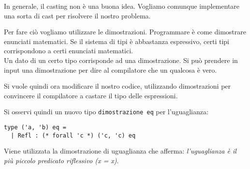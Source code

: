 \documentclass{article}
\begin{document}
In generale, il casting non è una buona idea. Vogliamo comunque implementare una sorta di cast per risolvere il nostro problema.

Per fare ciò vogliamo utilizzare le dimostrazioni. Programmare è come dimostrare enunciati matematici. Se il sistema di tipi è abbastanza espressivo, certi tipi corrispondono a certi enunciati matematici.\\
Un dato di un certo tipo corrisponde ad una dimostrazione. Si può prendere in input una dimostrazione per dire al compilatore che un qualcosa è vero.

Si vuole quindi ora modificare il nostro codice, utilizzando dimostrazioni per convincere il compilatore a castare il tipo delle espressioni.

Si osservi quindi un nuovo tipo \texttt{dimostrazione eq} per l'uguaglianza:
\begin{tcolorbox}
\begin{verbatim}
type ('a, 'b) eq = 
  | Refl : (* forall 'c *) ('c, 'c) eq 
\end{verbatim}
\end{tcolorbox}
Viene utilizzata la dimostrazione di uguaglianza che afferma: \textit{l'uguaglianza è il più piccolo predicato riflessivo (x = x)}.
\end{document}
